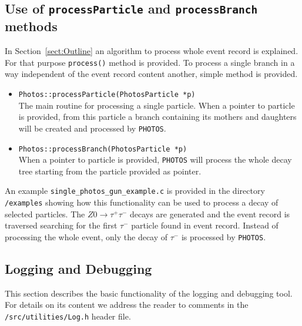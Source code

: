 \documentclass[]{Photos_interface_design}
\begin{document}
\subsection{Use of {\tt processParticle} and {\tt processBranch} methods}
\label{PHOTOSgun}

In Section~\ref{sect:Outline} an algorithm to process whole event record is explained.
For that purpose {\tt process()} method is provided.
To process a single branch in a way independent of the
event record content another, simple method is provided.

\begin{itemize}
  \item {\tt Photos::processParticle(PhotosParticle *p) } \hfill \\
		The main routine for processing a single particle. When a pointer to particle
		is provided, from this particle a branch containing its mothers and daughters
		will be created and processed by {\tt PHOTOS}.
  \item {\tt Photos::processBranch(PhotosParticle *p) } \hfill \\
 		When a pointer to particle is provided, {\tt PHOTOS} will process the whole decay
		tree starting from the particle	provided as pointer.
\end{itemize}

An example {\tt single\_photos\_gun\_example.c} is provided in the directory {\tt /examples}
showing how this functionality can be used to process a decay of selected particles.
The $Z0 \rightarrow \tau^+ \tau^-$ decays are generated and the event record is traversed
searching for the first $\tau^-$ particle found in event record.
Instead of processing the whole event, only the decay of $\tau^-$ is processed by {\tt PHOTOS}.


\subsection{Logging and Debugging}
\label{App:Logging}
This section describes the basic functionality of the logging and debugging tool.
For details on its content we address the reader to comments in the {\tt /src/utilities/Log.h} header file.
\end{document}

